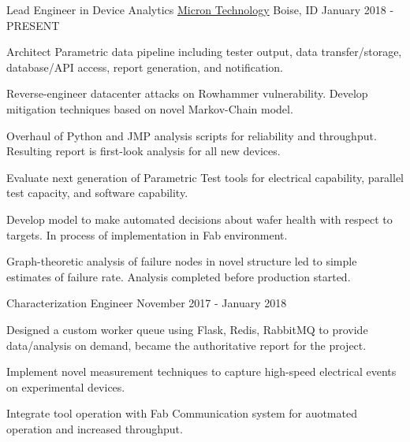

\begin{cventries}

  \cventry
    {Lead Engineer in Device Analytics} %
    {\href{https://www.micron.com}{Micron Technology}} %
    {Boise, ID} %
    {January 2018 - PRESENT} %
    {
      \begin{cvitems} %
        \item {Architect Parametric data pipeline including tester output, data transfer/storage, database/API access, report generation, and notification.}
        \item {Reverse-engineer datacenter attacks on Rowhammer vulnerability. Develop mitigation techniques based on novel Markov-Chain model.}
        \item {Overhaul of Python and JMP analysis scripts for reliability and throughput. Resulting report is first-look analysis for all new devices.}
        \item {Evaluate next generation of Parametric Test tools for electrical capability, parallel test capacity, and software capability.}
        \item {Develop model to make automated decisions about wafer health with respect to targets. In process of implementation in Fab environment.}
        \item {Graph-theoretic analysis of failure nodes in novel structure led to simple estimates of failure rate. Analysis completed before production started.}
      \end{cvitems}
    }

  \cventry
    {Characterization Engineer} %
    {} %
    {} %
    {November 2017 - January 2018} %
    {
      \begin{cvitems} %
        \item {Designed a custom worker queue using Flask, Redis, RabbitMQ to provide data/analysis on demand, became the authoritative report for the project.}
        \item {Implement novel measurement techniques to capture high-speed electrical events on experimental devices.}
        \item {Integrate tool operation with Fab Communication system for auotmated operation and increased throughput.}
      \end{cvitems}
    }


\end{cventries}
